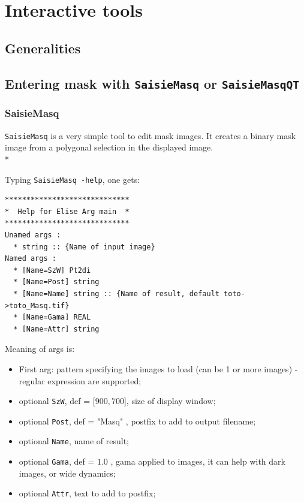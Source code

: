\chapter{Interactive tools}

\section{Generalities}


\section{Entering mask with {\tt SaisieMasq} or {\tt SaisieMasqQT} }

\subsection{SaisieMasq}

{\tt SaisieMasq} is a very simple tool to edit mask images.
It creates a binary mask image from a polygonal selection in the displayed image.\\*

Typing {\tt SaisieMasq -help}, one gets:

\begin{verbatim}
*****************************
*  Help for Elise Arg main  *
*****************************
Unamed args :
  * string :: {Name of input image}
Named args :
  * [Name=SzW] Pt2di
  * [Name=Post] string
  * [Name=Name] string :: {Name of result, default toto->toto_Masq.tif}
  * [Name=Gama] REAL
  * [Name=Attr] string
\end{verbatim}

Meaning of args is:

\begin{itemize}
   \item First arg: pattern specifying the images to load (can be 1 or more images) - regular expression are supported;
   \item optional {\tt SzW}, def = [$900,700$], size of display window;
   \item optional {\tt Post}, def = "Masq" , postfix to add to output filename;
   \item optional {\tt Name}, name of result;
   \item optional {\tt Gama}, def = $1.0$ , gama applied to images, it can help with dark images, or wide dynamics;
   \item optional {\tt Attr}, text to add to postfix;
\end{itemize}


